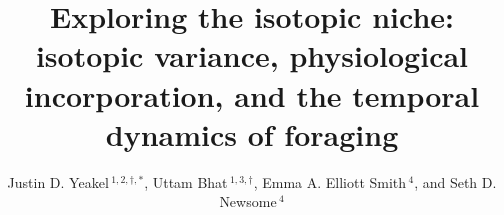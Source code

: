 \documentclass{frontiersSCNS}
\def\firstAuthorLast{Yeakel {et~al.}} %
\def\Authors{
Justin D. Yeakel\,$^{1,2,\dagger,*}$,
Uttam Bhat\,$^{1,3,\dagger}$,
Emma A. Elliott Smith\,$^4$,
and Seth D. Newsome\,$^4$}
\begin{document}
\onecolumn
{}

\title[Exploring the isotopic niche]{Exploring the isotopic niche: isotopic variance, physiological incorporation, and the temporal dynamics of foraging}

\author[\firstAuthorLast ]{\Authors} %
\address{} %
\correspondance{} %

\extraAuth{}%


\maketitle


%
\end{document}
